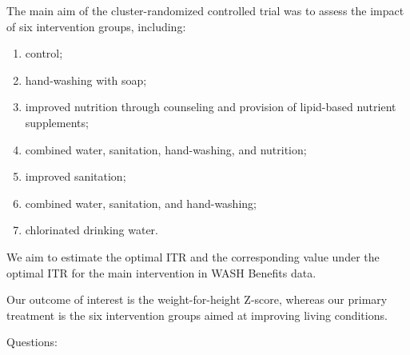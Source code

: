 \documentclass[
  12pt, krantz2,
]{krantz}
\newcommand{\1}{\mathbbm{1}}
\theoremstyle{definition}
\theoremstyle{definition}
\theoremstyle{definition}
\theoremstyle{definition}
\theoremstyle{remark}
\begin{document}
The main aim of the cluster-randomized controlled trial was to assess the
impact of six intervention groups, including:

\begin{enumerate}
\def\labelenumi{\arabic{enumi}.}
\item
  control;
\item
  hand-washing with soap;
\item
  improved nutrition through counseling and provision of lipid-based nutrient
  supplements;
\item
  combined water, sanitation, hand-washing, and nutrition;
\item
  improved sanitation;
\item
  combined water, sanitation, and hand-washing;
\item
  chlorinated drinking water.
\end{enumerate}

We aim to estimate the optimal ITR and the corresponding value under the optimal
ITR for the main intervention in WASH Benefits data.

Our outcome of interest is the weight-for-height Z-score, whereas our primary
treatment is the six intervention groups aimed at improving living conditions.

Questions:
\end{document}
